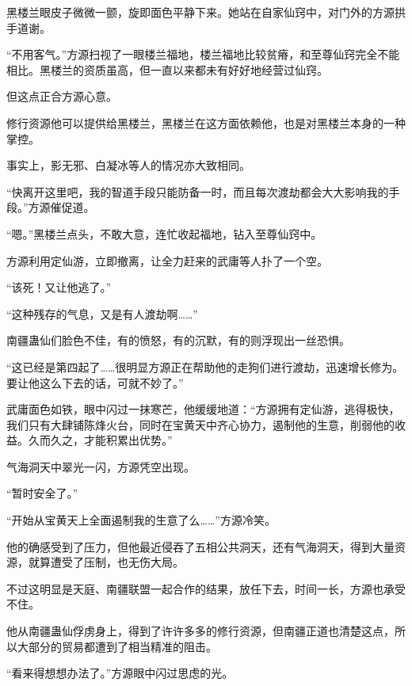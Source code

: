 \begin{this_body}
黑楼兰眼皮子微微一颤，旋即面色平静下来。她站在自家仙窍中，对门外的方源拱手道谢。

“不用客气。”方源扫视了一眼楼兰福地，楼兰福地比较贫瘠，和至尊仙窍完全不能相比。黑楼兰的资质虽高，但一直以来都未有好好地经营过仙窍。

但这点正合方源心意。

修行资源他可以提供给黑楼兰，黑楼兰在这方面依赖他，也是对黑楼兰本身的一种掌控。

事实上，影无邪、白凝冰等人的情况亦大致相同。

“快离开这里吧，我的智道手段只能防备一时，而且每次渡劫都会大大影响我的手段。”方源催促道。

“嗯。”黑楼兰点头，不敢大意，连忙收起福地，钻入至尊仙窍中。

方源利用定仙游，立即撤离，让全力赶来的武庸等人扑了一个空。

“该死！又让他逃了。”

“这种残存的气息，又是有人渡劫啊……”

南疆蛊仙们脸色不佳，有的愤怒，有的沉默，有的则浮现出一丝恐惧。

“这已经是第四起了……很明显方源正在帮助他的走狗们进行渡劫，迅速增长修为。要让他这么下去的话，可就不妙了。”

武庸面色如铁，眼中闪过一抹寒芒，他缓缓地道：“方源拥有定仙游，逃得极快，我们只有大肆铺陈烽火台，同时在宝黄天中齐心协力，遏制他的生意，削弱他的收益。久而久之，才能积累出优势。”

气海洞天中翠光一闪，方源凭空出现。

“暂时安全了。”

“开始从宝黄天上全面遏制我的生意了么……”方源冷笑。

他的确感受到了压力，但他最近侵吞了五相公共洞天，还有气海洞天，得到大量资源，就算遭受了压制，也无伤大局。

不过这明显是天庭、南疆联盟一起合作的结果，放任下去，时间一长，方源也承受不住。

他从南疆蛊仙俘虏身上，得到了许许多多的修行资源，但南疆正道也清楚这点，所以大部分的贸易都遭到了相当精准的阻击。

“看来得想想办法了。”方源眼中闪过思虑的光。

\end{this_body}

